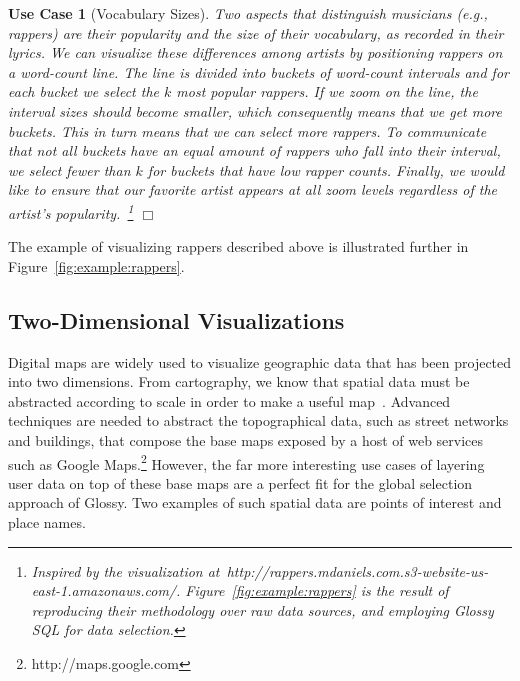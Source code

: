 \documentclass[11pt, oneside]{report}
\newtheorem{example}{Use Case}
\newcommand{\mathendbox}{\hfill$\Box$}
\begin{document}
\begin{example}[Vocabulary Sizes]\label{ex:rappers}
Two aspects that distinguish musicians (e.g., rappers) are their popularity and the size of their vocabulary, as recorded in their lyrics. We can visualize these differences among artists by positioning rappers on a word-count line. The line is divided into buckets of word-count intervals and for each bucket we select the $k$ most popular rappers. If we zoom on the line, the interval sizes should become smaller, which consequently means that we get more buckets. This in turn means that we can select more rappers. To communicate that not all buckets have an equal amount of rappers who fall into their interval, we select fewer than $k$ for buckets that have low rapper counts. Finally, we would like to ensure that our favorite artist appears at all zoom levels regardless of the artist's popularity.~\footnote{Inspired by the visualization at~http://rappers.mdaniels.com.s3-website-us-east-1.amazonaws.com/. Figure~\ref{fig:example:rappers} is the result of reproducing their methodology over raw data sources, and employing Glossy SQL for data selection.} \mathendbox
\end{example}

The example of visualizing rappers described above is illustrated further in Figure~\ref{fig:example:rappers}.

\subsection{Two-Dimensional Visualizations}
\label{sec:examples:two:dimensional}

Digital maps are widely used to visualize geographic data that has been projected into two dimensions. From cartography, we know that spatial data must be abstracted according to scale in order to make a useful map~\cite{NeunBW09:GeneralizationWeb,WareJT03:GeneralizationMeta}. Advanced techniques are needed to abstract the topographical data, such as street networks and buildings, that compose the base maps exposed by a host of web services such as Google Maps.\footnote{http://maps.google.com} However, the far more interesting use cases of layering user data on top of these base maps are a perfect fit for the global selection approach of Glossy. Two examples of such spatial data are points of interest and place names. 
\end{document}
